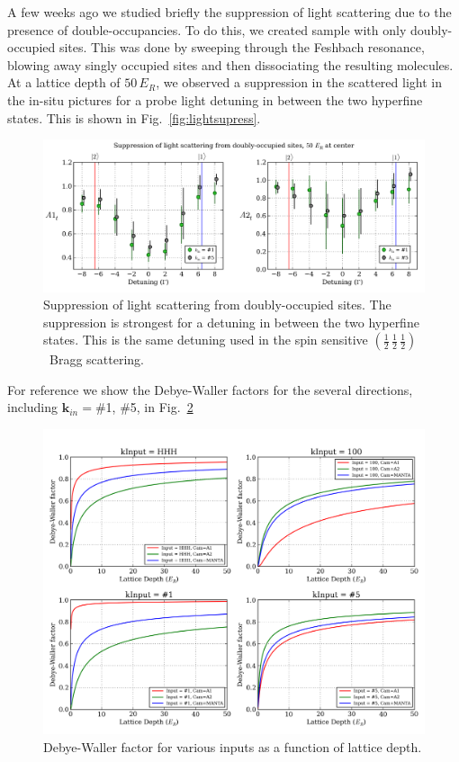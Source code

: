 \documentclass[11pt,letter]{article}
\newcommand{\bv}[1]{\ensuremath{\bm{#1}}}
\newcommand{\hhh}{\ensuremath{\left( \frac{1}{2}\,\frac{1}{2}\,\frac{1}{2}\right)  }}
\begin{document}
A few weeks ago we studied briefly the suppression of light scattering due to
the presence of double-occupancies.  To do this, we created sample with only
doubly-occupied sites. This was done by sweeping through the Feshbach
resonance, blowing away singly occupied sites and then dissociating the
resulting molecules.   At a lattice depth of $50\,E_{R}$, we observed a
suppression in the scattered light in the in-situ pictures for a probe light
detuning in between the two hyperfine states.  This is shown in
Fig.~\ref{fig:lightsupress}.
 \begin{figure} \centering
\includegraphics[width=\textwidth]{../Ut_Comp/suppress_Figure_Fancy.png}
\caption[Suppression of light scattering from doubly-occupied sites.]{\small
Suppression of light scattering from doubly-occupied sites.  The suppression is
strongest for a detuning in between the two hyperfine states.  This is the same
detuning used in the spin sensitive \hhh\ Bragg scattering.}
\label{fig:lightsuppress} 
\end{figure}
For reference we show the Debye-Waller factors for the several directions,
including $\bv{k}_{in} = $\#1, \#5,  in Fig.~\ref{fig:debyewaller_v0}
\begin{figure} \centering
\includegraphics[width=\textwidth]{../Ut_Comp/DWv0_plot.png}
\caption[Debye-Waller factor for various inputs as a function of lattice depth.]{\small Debye-Waller factor for various inputs as a function of lattice depth.}
\label{fig:debyewaller_v0} 
\end{figure}
\end{document}

